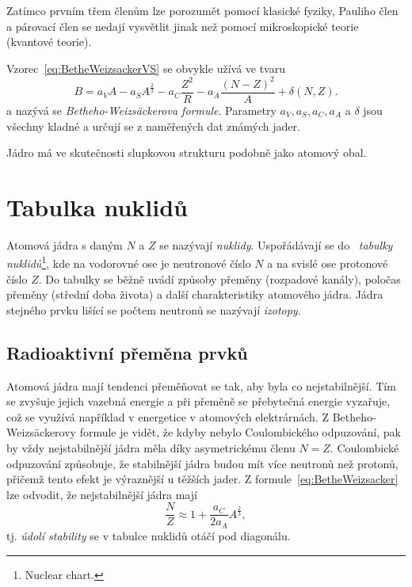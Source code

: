 \documentclass[a4paper,12pt,oneside]{article}
\theoremstyle{red}
\begin{document}
    Zatímco prvním třem členům lze porozumět pomocí klasické fyziky, Pauliho člen a párovací člen se nedají vysvětlit jinak než pomocí mikroskopické teorie (kvantové teorie).

    Vzorec~\eqref{eq:BetheWeizsackerVS} se obvykle užívá ve tvaru
    \begin{equation}
        \label{eq:BetheWeizsacker}
        B=a_{V}A-a_{S}A^{\frac{2}{3}}-a_{C}\frac{Z^{2}}{R}-a_{A}\frac{\left(N-Z\right)^{2}}{A}+\delta(N,Z).
    \end{equation}
    a nazývá se \emph{Betheho-Weizsäckerova formule}.
    Parametry $a_{V},a_{S},a_{C},a_{A}$ a $\delta$ jsou všechny kladné a určují se z naměřených dat známých jader.

    Jádro má ve skutečnosti slupkovou strukturu podobně jako atomový obal.

\section{Tabulka nuklidů}
    Atomová jádra s daným $N$ a $Z$ se nazývají \emph{nuklidy}.
    Uspořádávají se do ~\emph{tabulky nuklidů}\footnote{Nuclear chart.}, kde na vodorovné ose je neutronové číslo $N$ a na svislé ose protonové číslo $Z$.
    Do tabulky se běžně uvádí způsoby přeměny (rozpadové kanály), poločas přeměny (střední doba života) a další charakteristiky atomového jádra.
    Jádra stejného prvku lišící se počtem neutronů se nazývají \emph{izotopy}.

    \subsection{Radioaktivní přeměna prvků}
        Atomová jádra mají tendenci přeměňovat se tak, aby byla co nejstabilnější. Tím se zvyšuje jejich vazebná energie a při přeměně se přebytečná energie vyzařuje, což se využívá například v energetice v atomových elektrárnách.
        Z Betheho-Weizsäckerovy formule je vidět, že kdyby nebylo Coulombického odpuzování, pak by vždy nejstabilnější jádra měla díky asymetrickému členu $N=Z$.        
        Coulombické odpuzování způsobuje, že stabilnější jádra budou mít více neutronů než protonů, přičemž tento efekt je výraznější u těžších jader.
        Z formule~\eqref{eq:BetheWeizsacker} lze odvodit, že nejstabilnější jádra mají 
        \begin{equation}
            \frac{N}{Z}\approx 1+\frac{a_{C}}{2a_{A}}A^{\frac{2}{3}},
        \end{equation}
        tj. \emph{údolí stability} se v tabulce nuklidů otáčí pod diagonálu.
\end{document}
